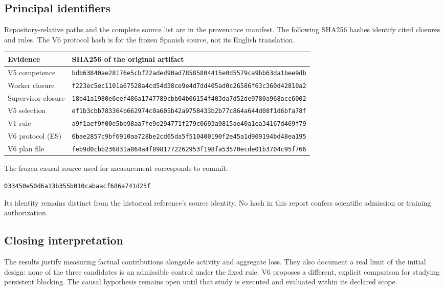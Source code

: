 \documentclass[11pt,a4paper]{article}
\begin{document}
\subsection{Principal identifiers}
Repository-relative paths and the complete source list are in the provenance
manifest. The following SHA256 hashes identify cited closures and rules. The
V6 protocol hash is for the frozen Spanish source, not its English translation.

{\footnotesize
\begin{tabularx}{\linewidth}{@{}p{32mm}Y@{}}
\toprule
\textbf{Evidence} & \textbf{SHA256 of the original artifact}\\
\midrule
V5 competence & \texttt{bdb63840ae28176e5cbf22aded90ad78585804415e0d5579ca9bb63da1bee9db}\\
Worker closure & \texttt{f223ec5ec1101a67528a4cd54d38ce9e4d7dd405ad0c26586f63c360d42810a2}\\
Supervisor closure & \texttt{18b41a1980e6eef486a1747789cbb04b06154f403da7d52de9780a968acc6002}\\
V5 selection & \texttt{ef1b3cbb783364b662974c0a605b42a9758433b2b77c864a644d08f1d6bfa78f}\\
V1 rule & \texttt{a9f1aef9f00e5bb98aa7fe9e294771f279c0693a9815ae40a1ea34167d469f79}\\
V6 protocol (ES) & \texttt{6bae2857c9bf6910aa728be2cd65da5f510400190f2e45a1d909194bd48ea195}\\
V6 plan file & \texttt{feb9d0cbb236831a864a4f8981772262953f198fa53570ecde01b3704c95f766}\\
\bottomrule
\end{tabularx}}

The frozen causal source used for measurement corresponds to commit:
\begin{center}\texttt{033450e50d6a13b355b010cabaacf686a741d25f}\end{center}
Its identity remains distinct from the historical reference's source identity.
No hash in this report confers scientific admission or training authorization.

\subsection{Closing interpretation}
The results justify measuring factual contributions alongside activity and
aggregate loss. They also document a real limit of the initial design: none of
the three candidates is an admissible control under the fixed rule. V6 proposes
a different, explicit comparison for studying persistent blocking. The causal
hypothesis remains open until that study is executed and evaluated within its
declared scope.
\end{document}
